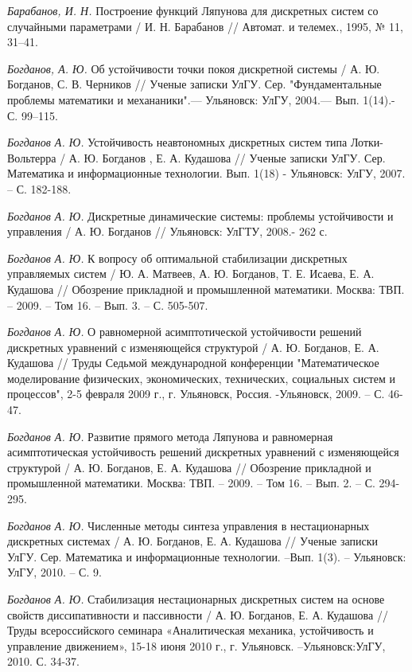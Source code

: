 \begin{thebibliography}{10}
	{\it Барабанов, И. Н.} Построение функций Ляпунова для дискретных систем со случайными параметрами / И. Н. Барабанов // Автомат. и телемех., 1995, № 11, 31–41.
	
	{\it Богданов, А. Ю.} Об устойчивости точки покоя дискретной системы / А. Ю. Богданов, С. В. Черников // Ученые записки УлГУ. Сер. "Фундаментальные проблемы математики и механаники".— Ульяновск: УлГУ, 2004.— Вып. 1(14).- С. 99–115.
	

	{\it Богданов А. Ю.} Устойчивость неавтономных дискретных систем типа Лотки-Вольтерра / А. Ю. Богданов , Е. А. Кудашова //
	Ученые записки УлГУ. Сер. Математика и информационные технологии. Вып. 1(18) - Ульяновск: УлГУ, 2007. – С. 182-188.
	
	{\it Богданов А. Ю.} Дискретные динамические системы: проблемы устойчивости и управления / А. Ю. Богданов //
	Ульяновск: УлГТУ, 2008.- 262 с.
	
	{\it Богданов А. Ю.} К вопросу об оптимальной стабилизации дискретных управляемых систем / Ю. А. Матвеев, А. Ю. Богданов, Т. Е. Исаева, Е. А. Кудашова  //
	Обозрение прикладной и промышленной математики.  Москва: ТВП. – 2009. – Том 16. – Вып. 3. – С. 505-507.
	
	{\it Богданов А. Ю.} О равномерной асимптотической устойчивости решений дискретных уравнений с изменяющейся структурой / А. Ю. Богданов, Е. А. Кудашова //
	Труды Седьмой международной конференции "Математическое моделирование физических, экономических, технических, социальных систем и процессов", 2-5 февраля 2009 г., г. Ульяновск, Россия. -Ульяновск, 2009. – С. 46-47.
	
	{\it Богданов А. Ю.} Развитие прямого метода Ляпунова и равномерная асимптотическая устойчивость решений дискретных уравнений с изменяющейся структурой / А. Ю. Богданов, Е. А. Кудашова //
	Обозрение прикладной и промышленной математики.  Москва: ТВП. – 2009. – Том 16. – Вып. 2. – С. 294-295.
	
	{\it Богданов А. Ю.} Численные методы синтеза управления в нестационарных дискретных системах / А. Ю. Богданов, Е. А. Кудашова //
	Ученые записки УлГУ. Сер. Математика и информационные технологии. –Вып. 1(3). – Ульяновск: УлГУ, 2010. – С. 9.
	
	{\it Богданов А. Ю.} Стабилизация нестационарных дискретных систем на основе свойств диссипативности и пассивности / А. Ю. Богданов, Е. А. Кудашова //
	Труды всероссийского семинара «Аналитическая механика, устойчивость и управление движением», 15-18 июня 2010 г., г. Ульяновск. –Ульяновск:УлГУ, 2010. С. 34-37.
	

\end{thebibliography}
